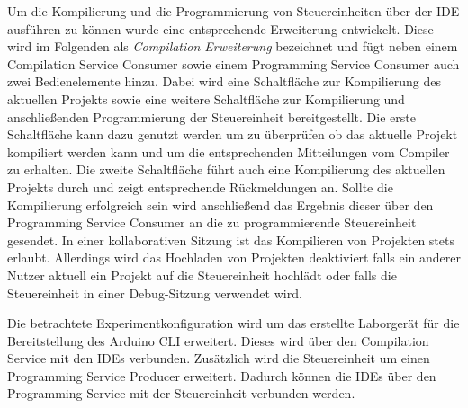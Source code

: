 Um die Kompilierung und die Programmierung von Steuereinheiten über der IDE ausführen zu können wurde eine entsprechende Erweiterung entwickelt. Diese wird im Folgenden als \textit{Compilation Erweiterung} bezeichnet und fügt neben einem Compilation Service Consumer sowie einem Programming Service Consumer auch zwei Bedienelemente hinzu. Dabei wird eine Schaltfläche zur Kompilierung des aktuellen Projekts sowie eine weitere Schaltfläche zur Kompilierung und anschließenden Programmierung der Steuereinheit bereitgestellt. Die erste Schaltfläche kann dazu genutzt werden um zu überprüfen ob das aktuelle Projekt kompiliert werden kann und um die entsprechenden Mitteilungen vom Compiler zu erhalten. Die zweite Schaltfläche führt auch eine Kompilierung des aktuellen Projekts durch und zeigt entsprechende Rückmeldungen an. Sollte die Kompilierung erfolgreich sein wird anschließend das Ergebnis dieser über den Programming Service Consumer an die zu programmierende Steuereinheit gesendet. In einer kollaborativen Sitzung ist das Kompilieren von Projekten stets erlaubt. Allerdings wird das Hochladen von Projekten deaktiviert falls ein anderer Nutzer aktuell ein Projekt auf die Steuereinheit hochlädt oder falls die Steuereinheit in einer Debug-Sitzung verwendet wird.

Die betrachtete Experimentkonfiguration wird um das erstellte Laborgerät für die Bereitstellung des Arduino CLI erweitert. Dieses wird über den Compilation Service mit den IDEs verbunden. Zusätzlich wird die Steuereinheit um einen Programming Service Producer erweitert. Dadurch können die IDEs über den Programming Service mit der Steuereinheit verbunden werden.
